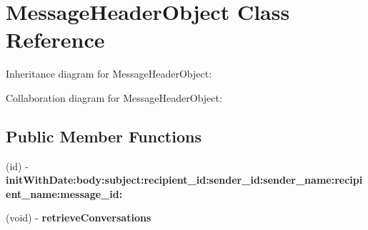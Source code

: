 \hypertarget{interface_message_header_object}{
\section{\-Message\-Header\-Object \-Class \-Reference}
\label{interface_message_header_object}
}


\-Inheritance diagram for \-Message\-Header\-Object\-:


\-Collaboration diagram for \-Message\-Header\-Object\-:
\subsection*{\-Public \-Member \-Functions}
\begin{DoxyCompactItemize}
\item 
\hypertarget{interface_message_header_object_a57a7b9b024edb345417054921733bef4}{
(id) -\/ {\bfseries init\-With\-Date\-:body\-:subject\-:recipient\-\_\-id\-:sender\-\_\-id\-:sender\-\_\-name\-:recipient\-\_\-name\-:message\-\_\-id\-:}}
\label{interface_message_header_object_a57a7b9b024edb345417054921733bef4}

\item 
\hypertarget{interface_message_header_object_ab5b7f4520a9f88524ffac77025065c4b}{
(void) -\/ {\bfseries retrieve\-Conversations}}
\label{interface_message_header_object_ab5b7f4520a9f88524ffac77025065c4b}

\end{DoxyCompactItemize}
